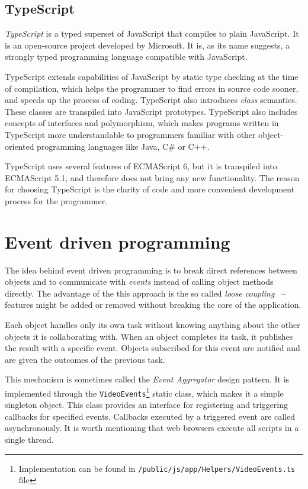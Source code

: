 \subsection{TypeScript}
\textit{TypeScript} is a typed superset of JavaScript that compiles to plain JavaScript\cite{typescript}. It is an open-source project developed by Microsoft. It is, as its name suggests, a strongly typed programming language compatible with JavaScript.

TypeScript extends capabilities of JavaScript by static type checking at the time of compilation, which helps the programmer to find errors in source code sooner, and speeds up the process of coding. TypeScript also introduces \textit{class} semantics. These classes are transpiled into JavaScript prototypes. TypeScript also includes concepts of interfaces and polymorphism, which makes programs written in TypeScript more understandable to programmers familiar with other object-oriented programming languages like Java, C\# or C++.

TypeScript uses several features of ECMAScript 6, but it is transpiled into ECMAScript 5.1, and therefore does not bring any new functionality. The reason for choosing TypeScript is the clarity of code and more convenient development process for the programmer.



\section{Event driven programming}
The idea behind event driven programming is to break direct references between objects and to communicate with \textit{events} instead of calling object methods directly. The advantage of the this approach is the so called \textit{loose coupling}~\cite{loose_coupling} -- features might be added or removed without breaking the core of the application.

Each object handles only its own task without knowing anything about the other objects it is collaborating with. When an object completes its task, it publishes the result with a specific event. Objects subscribed for this event are notified and are given the outcomes of the previous task.

This mechanism is sometimes called the \textit{Event Aggregator} design pattern. It is implemented through the \verb|VideoEvents|\footnote{Implementation can be found in \texttt{/public/js/app/Helpers/VideoEvents.ts} file} static class, which makes it a simple singleton object. This class provides an interface for registering and triggering callbacks for specified events. Callbacks executed by a triggered event are called asynchronously. It is worth mentioning that web browsers execute all scripts in a single thread.

